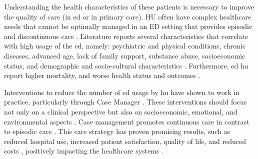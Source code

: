 \documentclass{bmcart}
\begin{document}
\par Understanding the health characteristics of these patients is necessary to improve the quality of care (in \gls{ed} or in primary care).
HU often have complex healthcare needs that cannot be optimally managed in an ED setting that provides episodic and discontinuous care \cite{abello_care_2012, soril_reducing_2015, mandelberg_epidemiologic_2000, sun_predictors_2003, okin_effects_2000}. 
Literature reports several characteristics that correlate with high usage of the \gls{ed}, namely:  psychiatric and physical conditions, chronic diseases, advanced age, lack of family support, substance abuse, socioeconomic status, and demographic and socio-cultural characteristics \cite{abello_care_2012, bodenmann_case_2017, chiu_statistical_2019, hudon_effectiveness_2016, moe_effectiveness_2017, navratil-strawn_emergency_2014, van_den_heede_interventions_2016, shumway_cost-effectiveness_2008, ruger_analysis_2004, frost_using_2017, sun_predictors_2003, lee_utilization_2007, doupe_frequent_2012}.   
Furthermore, \gls{ed} \gls{hu} report higher mortality, and worse health status and outcomes \cite{moe_effectiveness_2017, ruger_analysis_2004, sun_predictors_2003, chan_frequent_2002, blank_descriptive_2005}.
\par Interventions to reduce the number of \gls{ed} usage by \gls{hu} have shown to work in practice, particularly through Case Manager \cite{kumar_effectiveness_2013,moe_effectiveness_2017}.
These interventions should focus not only on a clinical perspective but also on socioeconomic, emotional, and environmental aspects \cite{grimmer-somers_holistic_2010}.
Case management promotes continuous care in contrast to episodic care \cite{kumar_effectiveness_2013}. 
This care strategy has proven promising results, such as reduced hospital use, increased patient satisfaction, quality of life, and reduced costs \cite{hudon_effectiveness_2016, shumway_cost-effectiveness_2008}, positively impacting the healthcare systems \cite{kumar_effectiveness_2013}. 
\end{document}
